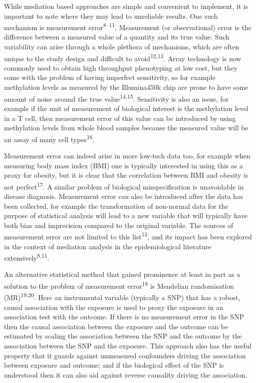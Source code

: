 \documentclass[]{article}
\begin{document}
While mediation based approaches are simple and convenient to implement,
it is important to note where they may lead to unreliable results. One
such mechanism is measurement error\textsuperscript{8--11}. Measurement
(or observational) error is the difference between a measured value of a
quantity and its true value. Such variability can arise through a whole
plethora of mechanisms, which are often unique to the study design and
difficult to avoid\textsuperscript{12,13}. Array technology is now
commonly used to obtain high throughput phenotyping at low cost, but
they come with the problem of having imperfect sensitivity, so for
example methylation levels as measured by the Illumina450k chip are
prone to have some amount of noise around the true
value\textsuperscript{14,15}. Sensitivity is also an issue, for example
if the unit of measurement of biological interest is the methylation
level in a T cell, then measurement error of this value can be
introduced by using methylation levels from whole blood samples because
the measured value will be an assay of many cell
types\textsuperscript{16}.

Measurement error can indeed arise in more low-tech data too, for
example when measuring body mass index (BMI) one is typically interested
in using this as a proxy for obesity, but it is clear that the
correlation between BMI and obesity is not perfect\textsuperscript{17}.
A similar problem of biological misspecification is unavoidable in
disease diagnosis. Measurement error can also be introduced after the
data has been collected, for example the transformation of non-normal
data for the purpose of statistical analysis will lead to a new variable
that will typically have both bias and imprecision compared to the
original variable. The sources of measurement error are not limited to
this list\textsuperscript{13}, and its impact has been explored in the
context of mediation analysis in the epidemiological literature
extensively\textsuperscript{8,11}.

An alternative statistical method that gained prominence at least in
part as a solution to the problem of measurement
error\textsuperscript{18} is Mendelian randomisation
(MR)\textsuperscript{19,20}. Here an instrumental variable (typically a
SNP) that has a robost, causal association with the exposure is used to
proxy the exposure in an association test with the outcome. If there is
no measurement error in the SNP then the causal association between the
exposure and the outcome can be estimated by scaling the association
between the SNP and the outcome by the association between the SNP and
the exposure. This approach also has the useful property that it guards
against unmeasured confounders driving the association between exposure
and outcome; and if the biological effect of the SNP is understood then
it can also aid against reverse causality driving the association.
\end{document}
